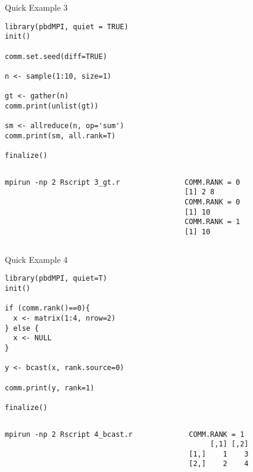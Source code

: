 \begin{frame}
  \begin{exampleblock}{Quick Example 3}
\begin{lstlisting}[title=Reduce and Gather: 3\_gt.r]
library(pbdMPI, quiet = TRUE)
init()

comm.set.seed(diff=TRUE)

n <- sample(1:10, size=1)

gt <- gather(n)
comm.print(unlist(gt))

sm <- allreduce(n, op='sum')
comm.print(sm, all.rank=T)

finalize()
\end{lstlisting}
  \begin{columns}[t,onlytextwidth]
    \begin{column}{0.58\textwidth}
\begin{lstlisting}[backgroundcolor=\color{white},keywordstyle=\color{black},title=Execute this script via:]
mpirun -np 2 Rscript 3_gt.r
\end{lstlisting}    
    \end{column}
    \hfill
    \begin{column}{0.4\textwidth}
\begin{lstlisting}[title=Sample Output:]
COMM.RANK = 0
[1] 2 8
COMM.RANK = 0
[1] 10
COMM.RANK = 1
[1] 10
\end{lstlisting}
    \end{column}
​  \end{columns}
  \end{exampleblock}
\end{frame}


\begin{frame}
  \begin{exampleblock}{Quick Example 4}
\begin{lstlisting}[title=Broadcast: 4\_bcast.r]
library(pbdMPI, quiet=T)
init()

if (comm.rank()==0){
  x <- matrix(1:4, nrow=2)
} else {
  x <- NULL
}

y <- bcast(x, rank.source=0)

comm.print(y, rank=1)

finalize()
\end{lstlisting}
  \begin{columns}[t,onlytextwidth]
    \begin{column}{0.58\textwidth}
\begin{lstlisting}[backgroundcolor=\color{white},keywordstyle=\color{black},title=Execute this script via:]
mpirun -np 2 Rscript 4_bcast.r
\end{lstlisting}
\end{column}
    \hfill
    \begin{column}{0.4\textwidth}
\begin{lstlisting}[title=Sample Output:]
COMM.RANK = 1
     [,1] [,2]
[1,]    1    3
[2,]    2    4
\end{lstlisting}
    \end{column}
​  \end{columns}
  \end{exampleblock}
\end{frame}


